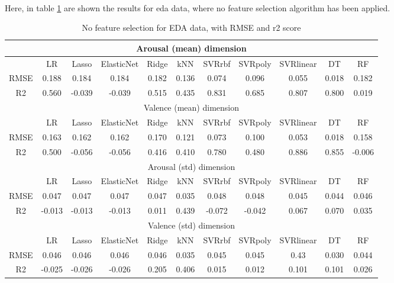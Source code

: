 \\
Here, in table \ref{table:eda_no_fs} are shown the results for \gls{eda} data, where no feature selection algorithm has been applied.
\\
\begin{table}[h!]
\begin{adjustwidth}{-3cm}{-1cm}
	\centering
	\begin{tabular}{|c|c|c|c|c|c|c|c|c|c|c|}
		\hline \multicolumn{11}{|c|}{Arousal (mean) dimension} \\
		\hline & LR & Lasso & ElasticNet & Ridge & kNN & SVRrbf & SVRpoly & SVRlinear & DT & RF \\
		\hline RMSE & 0.188 & 0.184 & 0.184 & 0.182 & 0.136 & 0.074 & 0.096 & 0.055 & \cellcolor{yellow}0.018 & 0.182 \\
		\hline R2 & 0.560 & -0.039 & -0.039 & 0.515 & 0.435 & \cellcolor{yellow}0.831 & 0.685 & 0.807 & 0.800 & 0.019 \\
		\hline \hline  \multicolumn{11}{|c|}{Valence (mean) dimension} \\
		\hline & LR & Lasso & ElasticNet & Ridge & kNN & SVRrbf & SVRpoly & SVRlinear & DT & RF \\
		\hline RMSE & 0.163 & 0.162 & 0.162 & 0.170 & 0.121 & 0.073 & 0.100 & 0.053 & \cellcolor{yellow}0.018 & 0.158 \\
		\hline R2 & 0.500 & -0.056 & -0.056 & 0.416 & 0.410 & 0.780 & 0.480 & \cellcolor{yellow}0.886 & 0.855 & -0.006 \\
		\hline \hline  \multicolumn{11}{|c|}{Arousal (std) dimension} \\
		\hline & LR & Lasso & ElasticNet & Ridge & kNN & SVRrbf & SVRpoly & SVRlinear & DT & RF \\
		\hline RMSE & 0.047 & 0.047 & 0.047 & 0.047 & 0.035 & 0.048 & 0.048 & 0.045 & \cellcolor{yellow}0.044 & 0.046 \\
		\hline R2 & -0.013 & -0.013 & -0.013 & 0.011 & \cellcolor{yellow}0.439 & -0.072 & -0.042 & 0.067 & 0.070 & 0.035 \\
		\hline \hline  \multicolumn{11}{|c|}{Valence (std) dimension} \\
		\hline & LR & Lasso & ElasticNet & Ridge & kNN & SVRrbf & SVRpoly & SVRlinear & DT & RF \\
		\hline RMSE & 0.046 & 0.046 & 0.046 & 0.046 & 0.035 & 0.045 & 0.045 & 0.43 & \cellcolor{yellow}0.030 & 0.044 \\
		\hline R2 & -0.025 & -0.026 & -0.026 & 0.205 & \cellcolor{yellow}0.406 & 0.015 & 0.012 & 0.101 & 0.101 & 0.026 \\
		\hline
	\end{tabular}
	\end{adjustwidth}
	\caption{No feature selection for EDA data, with RMSE and r2 score}
	\label{table:eda_no_fs}
\end{table}
